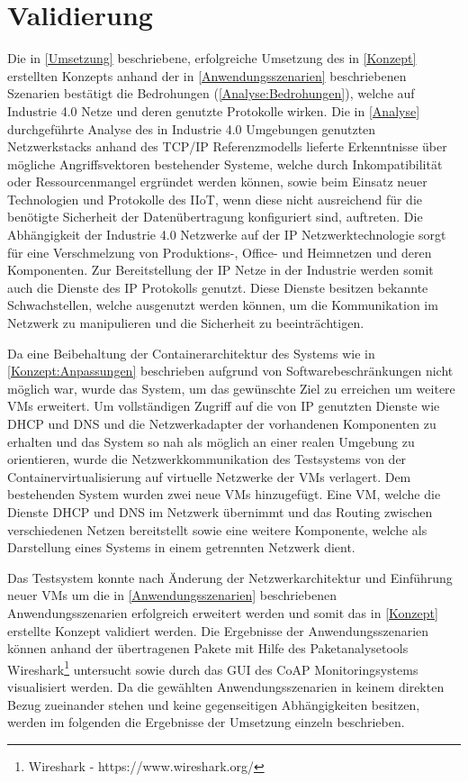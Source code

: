 \chapter{Validierung}
Die in \autoref{Umsetzung} beschriebene, erfolgreiche Umsetzung des in \autoref{Konzept} erstellten Konzepts anhand der in \autoref{Anwendungsszenarien} beschriebenen Szenarien bestätigt die Bedrohungen (\autoref{Analyse:Bedrohungen}), welche auf Industrie 4.0 Netze und deren genutzte Protokolle wirken. Die in \autoref{Analyse} durchgeführte Analyse des in Industrie 4.0 Umgebungen genutzten Netzwerkstacks anhand des \ac{TCP}/\ac{IP} Referenzmodells lieferte Erkenntnisse über mögliche Angriffsvektoren bestehender Systeme, welche durch Inkompatibilität oder Ressourcenmangel ergründet werden können, sowie beim Einsatz neuer Technologien und Protokolle des \ac{IIoT}, wenn diese nicht ausreichend für die benötigte Sicherheit der Datenübertragung konfiguriert sind, auftreten. Die Abhängigkeit der Industrie 4.0 Netzwerke auf der \ac{IP} Netzwerktechnologie sorgt für eine Verschmelzung von Produktions-, Office- und Heimnetzen und deren Komponenten. Zur Bereitstellung der \ac{IP} Netze in der Industrie werden somit auch die Dienste des \ac{IP} Protokolls genutzt. Diese Dienste besitzen bekannte Schwachstellen, welche ausgenutzt werden können, um die Kommunikation im Netzwerk zu manipulieren und die Sicherheit zu beeinträchtigen. 

Da eine Beibehaltung der Containerarchitektur des Systems wie in \autoref{Konzept:Anpassungen} beschrieben aufgrund von Softwarebeschränkungen nicht möglich war, wurde das System, um das gewünschte Ziel zu erreichen um weitere \ac{VM}s erweitert. Um vollständigen Zugriff auf die von \ac{IP} genutzten Dienste wie \ac{DHCP} und \ac{DNS} und die Netzwerkadapter der vorhandenen Komponenten zu erhalten und das System so nah als möglich an einer realen Umgebung zu orientieren, wurde die Netzwerkkommunikation des Testsystems von der Containervirtualisierung auf virtuelle Netzwerke der \ac{VM}s verlagert. Dem bestehenden System wurden zwei neue \ac{VM}s hinzugefügt. Eine \ac{VM}, welche die Dienste \ac{DHCP} und \ac{DNS} im Netzwerk übernimmt und das Routing zwischen verschiedenen Netzen bereitstellt sowie eine weitere Komponente, welche als Darstellung eines Systems in einem getrennten Netzwerk dient.

Das Testsystem konnte nach Änderung der Netzwerkarchitektur und Einführung neuer \ac{VM}s um die in \autoref{Anwendungsszenarien} beschriebenen Anwendungsszenarien erfolgreich erweitert werden und somit das in \autoref{Konzept} erstellte Konzept validiert werden. Die Ergebnisse der Anwendungsszenarien können anhand der übertragenen Pakete mit Hilfe des Paketanalysetools Wireshark\footnote{Wireshark - https://www.wireshark.org/} untersucht sowie durch das \ac{GUI} des \ac{CoAP} Monitoringsystems visualisiert werden. Da die gewählten Anwendungsszenarien in keinem direkten Bezug zueinander stehen und keine gegenseitigen Abhängigkeiten besitzen, werden im folgenden die Ergebnisse der Umsetzung einzeln beschrieben.

